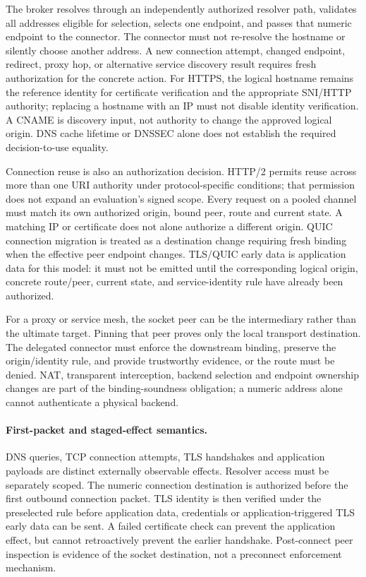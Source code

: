 \documentclass[11pt,letterpaper]{article}
\begin{document}
The broker resolves through an independently authorized resolver path, validates all addresses eligible for selection, selects one endpoint, and passes that numeric endpoint to the connector. The connector must not re-resolve the hostname or silently choose another address. A new connection attempt, changed endpoint, redirect, proxy hop, or alternative service discovery result requires fresh authorization for the concrete action. For HTTPS, the logical hostname remains the reference identity for certificate verification and the appropriate SNI/HTTP authority; replacing a hostname with an IP must not disable identity verification.\cite{rfc9525} A CNAME is discovery input, not authority to change the approved logical origin. DNS cache lifetime or DNSSEC alone does not establish the required decision-to-use equality.

Connection reuse is also an authorization decision. HTTP/2 permits reuse across more than one URI authority under protocol-specific conditions;\cite{rfc9113} that permission does not expand an evaluation's signed scope. Every request on a pooled channel must match its own authorized origin, bound peer, route and current state. A matching IP or certificate does not alone authorize a different origin.
QUIC connection migration is treated as a destination change requiring fresh binding when the effective peer endpoint changes. TLS/QUIC early data is application data for this model: it must not be emitted until the corresponding logical origin, concrete route/peer, current state, and service-identity rule have already been authorized.

For a proxy or service mesh, the socket peer can be the intermediary rather than the ultimate target. Pinning that peer proves only the local transport destination. The delegated connector must enforce the downstream binding, preserve the origin/identity rule, and provide trustworthy evidence, or the route must be denied. NAT, transparent interception, backend selection and endpoint ownership changes are part of the binding-soundness obligation; a numeric address alone cannot authenticate a physical backend.

\paragraph{First-packet and staged-effect semantics.}
DNS queries, TCP connection attempts, TLS handshakes and application payloads are distinct externally observable effects. Resolver access must be separately scoped. The numeric connection destination is authorized before the first outbound connection packet. TLS identity is then verified under the preselected rule before application data, credentials or application-triggered TLS early data can be sent. A failed certificate check can prevent the application effect, but cannot retroactively prevent the earlier handshake. Post-connect peer inspection is evidence of the socket destination, not a preconnect enforcement mechanism.
\end{document}
